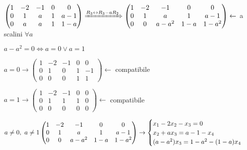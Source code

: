 \documentclass{article}
\begin{document}
\begin{enumerate}
\begin{enumerate}
			            $\begin{pmatrix}
					            1 & -2 & -1 & 0 & 0   \\
					            0 & 1  & a  & 1 & a-1 \\
					            0 & a  & a  & 1 & 1-a
				            \end{pmatrix}\xRightarrow{R_3\leftrightarrow R_3-aR_2}
				            \begin{pmatrix}
					            1 & -2 & -1    & 0   & 0     \\
					            0 & 1  & a     & 1   & a-1   \\
					            0 & 0  & a-a^2 & 1-a & 1-a^2
				            \end{pmatrix}\leftarrow$ a scalini $\forall a$

			            $a-a^2=0\Leftrightarrow a=0\vee a=1$

			            $a=0\rightarrow
				            \begin{pmatrix}
					            1 & -2 & -1 & 0 & 0  \\
					            0 & 1  & 0  & 1 & -1 \\
					            0 & 0  & 0  & 1 & 1
				            \end{pmatrix}\leftarrow$ compatibile

			            $a=1\rightarrow
				            \begin{pmatrix}
					            1 & -2 & -1 & 0 & 0 \\
					            0 & 1  & 1  & 1 & 0 \\
					            0 & 0  & 0  & 0 & 0
				            \end{pmatrix}\leftarrow$ compatibile

			            $a\not=0,\ a\not=1\\
				            \begin{pmatrix}
					            1 & -2 & -1    & 0   & 0     \\
					            0 & 1  & a     & 1   & a-1   \\
					            0 & 0  & a-a^2 & 1-a & 1-a^2
				            \end{pmatrix}\rightarrow
				            \begin{cases}
					            x_1-2x_2-x_3=0   \\
					            x_2+ax_3=a-1-x_4 \\
					            (a-a^2)x_3=1-a^2-(1-a)x_4
				            \end{cases}$
		      \end{enumerate}
	\end{enumerate}
\end{document}
